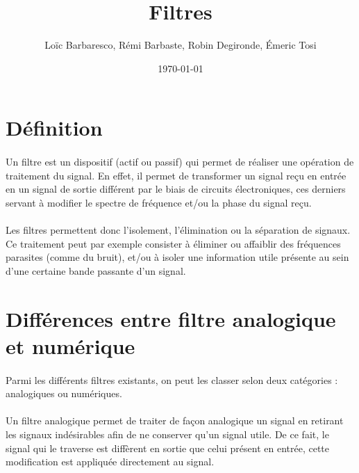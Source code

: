 \documentclass[a4paper,11pt]{article}
\title{Filtres}
\author{Loïc Barbaresco, Rémi Barbaste, Robin Degironde, Émeric Tosi}
\date{\today}
\begin{document}
    \maketitle{}
    \clearpage

    \setcounter{tocdepth}{1} %
    \renewcommand{\contentsname}{Sommaire} %
    \tableofcontents{} %
    \clearpage


\section{Définition}
    \paragraph{}
Un filtre est un dispositif (actif ou passif) qui permet de réaliser une opération de traitement du signal.
En effet, il permet de transformer un signal reçu en entrée en un signal de sortie différent par le biais de circuits électroniques, ces derniers servant à modifier le spectre de fréquence et/ou la phase du signal reçu.
    \paragraph{}
Les filtres permettent donc l’isolement, l’élimination ou la séparation de signaux.
Ce traitement peut par exemple consister à éliminer ou affaiblir des fréquences parasites (comme du bruit), et/ou à isoler une information utile présente au sein d'une certaine bande passante d'un signal.

    \clearpage

\section{Différences entre filtre analogique et numérique}
    \paragraph{}
Parmi les différents filtres existants, on peut les classer selon deux catégories : analogiques ou numériques.
    \paragraph{}
Un filtre analogique permet de traiter de façon analogique un signal en retirant les signaux indésirables afin de ne conserver qu’un signal utile.
De ce fait, le signal qui le traverse est diffèrent en sortie que celui présent en entrée, cette modification est appliquée directement au signal.
\end{document}
